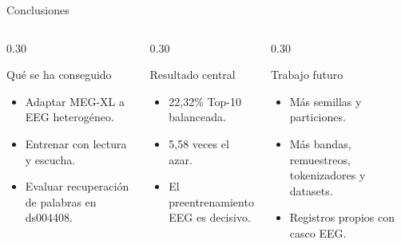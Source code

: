 \documentclass[aspectratio=169,10pt]{beamer}
\begin{document}
\begin{frame}[c]{Conclusiones}
  \small
  \begin{columns}[T,totalwidth=\linewidth]
    \begin{column}{0.30\linewidth}
      \begin{block}{Qué se ha conseguido}
        \begin{minipage}[t][30mm][t]{\linewidth}
        \begin{itemize}
          \item Adaptar MEG-XL a EEG heterogéneo.
          \item Entrenar con lectura y escucha.
          \item Evaluar recuperación de palabras en ds004408.
        \end{itemize}
        \end{minipage}
      \end{block}
    \end{column}
    \hfill

    \begin{column}{0.30\linewidth}
      \begin{block}{Resultado central}
        \begin{minipage}[t][30mm][t]{\linewidth}
        \begin{itemize}
          \item 22,32\% Top-10 balanceada.
          \item 5,58 veces el azar.
          \item El preentrenamiento EEG es decisivo.
        \end{itemize}
        \end{minipage}
      \end{block}
    \end{column}
    \hfill

    \begin{column}{0.30\linewidth}
      \begin{block}{Trabajo futuro}
        \begin{minipage}[t][30mm][t]{\linewidth}
        \begin{itemize}
          \item Más semillas y particiones.
          \item Más bandas, remuestreos, tokenizadores y datasets.
          \item Registros propios con casco EEG.
        \end{itemize}
        \end{minipage}
      \end{block}
    \end{column}
  \end{columns}


\end{frame}
\end{document}
